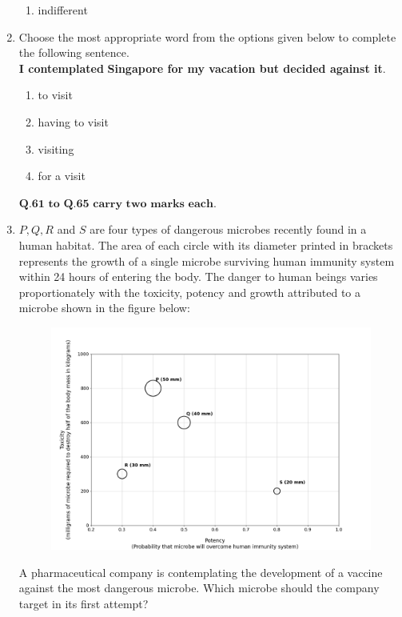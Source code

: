 \documentclass[journal]{IEEEtran}
\begin{document}
\begin{enumerate}[start=53]
\begin{enumerate}
    \item indifferent
\end{enumerate}
\item Choose the most appropriate word from the options given below to complete the following sentence.\\
\textbf{I contemplated} \underline{\hspace{1cm}} \textbf{Singapore for my vacation but decided against it}.
\begin{enumerate}
    \item to visit
    \item having to visit
    \item visiting
    \item for a visit
\end{enumerate}

$\textbf{Q.61 to Q.65 carry two marks each.}$
\item $P,Q,R$ and $S$ are four types of dangerous microbes recently found in a human habitat. The area of each circle with its diameter printed in brackets represents the growth of a single microbe surviving human immunity system within 24 hours of entering the body. The danger to human beings varies proportionately with the toxicity, potency and growth attributed to a microbe shown in the figure below:\\
\begin{figure}[h!]
    \centering
    \includegraphics[width=0.5\linewidth]{figs/Figure_1.png}
    \label{fig:enter-label}
\end{figure}
A pharmaceutical company is contemplating the development of a vaccine against the most dangerous microbe. Which microbe should the company target in its first attempt?
\begin{enumerate}

\end{enumerate}
\end{enumerate}
\end{document}
